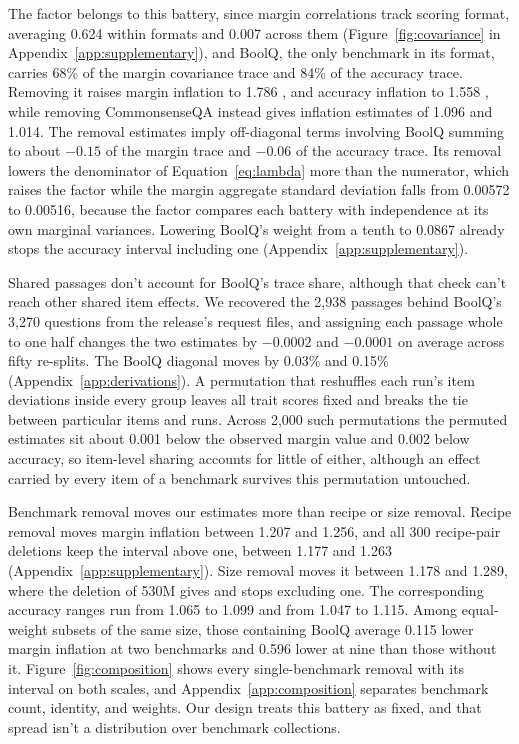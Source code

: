 The factor belongs to this battery, since margin correlations track scoring format, averaging 0.624 within formats and 0.007 across them (Figure~\ref{fig:covariance} in Appendix~\ref{app:supplementary}), and BoolQ, the only benchmark in its format, carries 68\% of the margin covariance trace and 84\% of the accuracy trace. Removing it raises margin inflation to 1.786 , and accuracy inflation to 1.558 , while removing CommonsenseQA instead gives inflation estimates of 1.096 and 1.014. The removal estimates imply off-diagonal terms involving BoolQ summing to about $-0.15$ of the margin trace and $-0.06$ of the accuracy trace. Its removal lowers the denominator of Equation~\ref{eq:lambda} more than the numerator, which raises the factor while the margin aggregate standard deviation falls from 0.00572 to 0.00516, because the factor compares each battery with independence at its own marginal variances. Lowering BoolQ's weight from a tenth to 0.0867 already stops the accuracy interval including one (Appendix~\ref{app:supplementary}).

Shared passages don't account for BoolQ's trace share, although that check can't reach other shared item effects. We recovered the 2,938 passages behind BoolQ's 3,270 questions from the release's request files, and assigning each passage whole to one half changes the two estimates by $-0.0002$ and $-0.0001$ on average across fifty re-splits. The BoolQ diagonal moves by 0.03\% and 0.15\% (Appendix~\ref{app:derivations}). A permutation that reshuffles each run's item deviations inside every group leaves all trait scores fixed and breaks the tie between particular items and runs. Across 2,000 such permutations the permuted estimates sit about 0.001 below the observed margin value and 0.002 below accuracy, so item-level sharing accounts for little of either, although an effect carried by every item of a benchmark survives this permutation untouched.

Benchmark removal moves our estimates more than recipe or size removal. Recipe removal moves margin inflation between 1.207 and 1.256, and all 300 recipe-pair deletions keep the interval above one, between 1.177 and 1.263 (Appendix~\ref{app:supplementary}). Size removal moves it between 1.178 and 1.289, where the deletion of 530M gives  and stops excluding one. The corresponding accuracy ranges run from 1.065 to 1.099 and from 1.047 to 1.115. Among equal-weight subsets of the same size, those containing BoolQ average 0.115 lower margin inflation at two benchmarks and 0.596 lower at nine than those without it. Figure~\ref{fig:composition} shows every single-benchmark removal with its interval on both scales, and Appendix~\ref{app:composition} separates benchmark count, identity, and weights. Our design treats this battery as fixed, and that spread isn't a distribution over benchmark collections.

